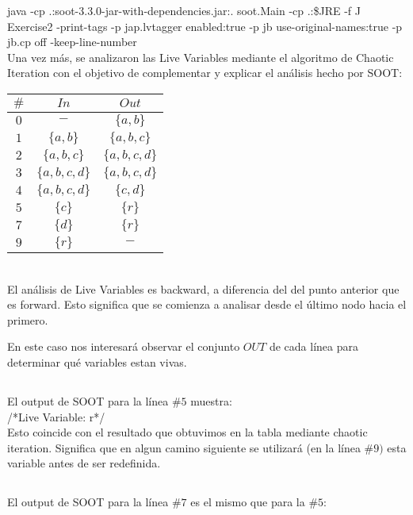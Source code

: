 java -cp .:soot-3.3.0-jar-with-dependencies.jar:. soot.Main -cp .:\$JRE -f J Exercise2 -print-tags -p jap.lvtagger enabled:true -p jb use-original-names:true -p jb.cp off -keep-line-number
\\

Una vez más, se analizaron las Live Variables mediante el algoritmo de Chaotic
Iteration con el objetivo de complementar y explicar el análisis hecho por SOOT:
\\

\begin{tabular}{| c | c | c |}
\hline
$\#$		& $In$				&$Out$ \\
\hline
$0$			& $-$				&$\{a, b\}$ \\
\hline
$1$			& $\{a, b\}$		&$\{a, b, c\}$ \\
\hline
$2$			& $\{a, b, c\}$		&$\{a, b, c, d\}$ \\
\hline
$3$			& $\{a, b, c, d\}$	&$\{a, b, c, d\}$ \\
\hline
$4$			& $\{a, b, c, d\}$	&$\{c, d\}$ \\
\hline
$5$			& $\{c\}$			&$\{r\}$ \\
\hline
$7$			& $\{d\}$			&$\{r\}$ \\
\hline
$9$			& $\{r\}$			&$-$ \\
\hline
\end{tabular}
\\

El análisis de Live Variables es backward, a diferencia del del punto anterior
que es forward. Esto significa que se comienza a analisar desde el último nodo
hacia el primero. 

En este caso nos interesará observar el conjunto $OUT$ de cada línea para
determinar qué variables estan vivas.

\subsection{}
El output de SOOT para la línea $\#5$ muestra:
\\

/*Live Variable: r*/
\\

Esto coincide con el resultado que obtuvimos en la tabla mediante chaotic
iteration. Significa que en algun camino siguiente se utilizará (en la línea 
$\#9)$ esta variable antes de ser redefinida.

\subsection{}
El output de SOOT para la línea $\#7$ es el mismo que para la $\#5$:

